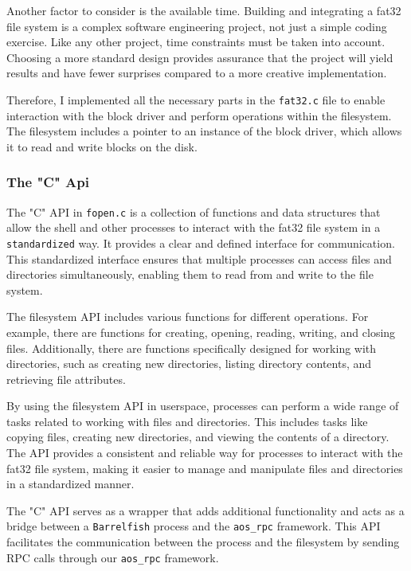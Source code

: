 {Another factor to consider is the available time. Building and integrating a fat32 file system is a complex software engineering project, not just a simple coding exercise. Like any other project, time constraints must be taken into account. Choosing a more standard design provides assurance that the project will yield results and have fewer surprises compared to a more creative implementation.

Therefore, I implemented all the necessary parts in the \texttt{fat32.c} file to enable interaction with the block driver and perform operations within the filesystem. The filesystem includes a pointer to an instance of the block driver, which allows it to read and write blocks on the disk.

\subsubsection{The "C" Api}

The "C" API in \texttt{fopen.c} is a collection of functions and data structures that allow the shell and other processes to interact with the fat32 file system in a \texttt{standardized} way. It provides a clear and defined interface for communication. This standardized interface ensures that multiple processes can access files and directories simultaneously, enabling them to read from and write to the file system.

The filesystem API includes various functions for different operations. For example, there are functions for creating, opening, reading, writing, and closing files. Additionally, there are functions specifically designed for working with directories, such as creating new directories, listing directory contents, and retrieving file attributes.

By using the filesystem API in userspace, processes can perform a wide range of tasks related to working with files and directories. This includes tasks like copying files, creating new directories, and viewing the contents of a directory. The API provides a consistent and reliable way for processes to interact with the fat32 file system, making it easier to manage and manipulate files and directories in a standardized manner.

The "C" API serves as a wrapper that adds additional functionality and acts as a bridge between a \texttt{Barrelfish} process and the \texttt{aos\_rpc} framework. This API facilitates the communication between the process and the filesystem by sending RPC calls through our \texttt{aos\_rpc} framework.

}
